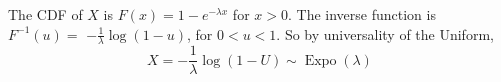 

\setcounter{theorem}{14}
\begin{exercise}[BH.5.15] 
\begin{solution}
    The CDF of $X$ is $F(x)=1-e^{-\lambda x}$ for $x>0$. The inverse function is $F^{-1}(u)=$ $-\frac{1}{\lambda} \log (1-u)$, for $0<u<1$. So by universality of the Uniform,
		$$
		X=-\frac{1}{\lambda} \log (1-U) \sim \operatorname{Expo}(\lambda)
		$$
\end{solution}
\end{exercise}


